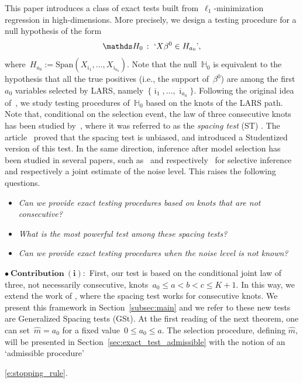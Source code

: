 \documentclass[final,numbib]{imaiai}%
\numberwithin{equation}{section}
\def\eq{\begin{equation}}
\def\qe{\end{equation}}
\renewcommand{\bar}{\overline}
\renewcommand{\hat}{\widehat}
\newcommand{\<}{\langle}
\renewcommand{\>}{\rangle}
\newcommand{\1}{\mathds{1}}
\begin{document}
{This paper introduces a class of exact tests built from~$\ell_1$-minimization regression in high-dimensions. {More precisely, we design a testing procedure for a null hypothesis of the form 
\eq
\notag
\mathds H_0\,:\ \text{`}X\beta^0\in H_{a_0}\text{'},
\qe
where~$H_{a_0}:=\mathrm{Span}(X_{\bar\imath_1},\ldots,X_{ \bar\imath_{a_0}})$.
Note that the null~$\mathds H_0$ is equivalent to the hypothesis that all the true positives (i.e., the support of~$\beta^0$) are among the first~$a_0$ variables selected by LARS, namely~$\{\bar\imath_1,\ldots,\bar\imath_{a_0}\}$.} Following the original idea of~\cite{lockhart2014significance}, we study testing procedures of~$\mathds H_0$ based on the knots of the LARS path.
Note that, conditional on the selection event, the law of three consecutive knots has been studied by~\cite{lockhart2014significance}, where it was referred to as the {\it spacing test} (ST) \citep{hastie2015statistical}.
The article~\cite{azais2018power} proved that the spacing test is unbiased, and introduced a Studentized version of this test.
In the same direction, inference after model selection has been studied in several papers, such as~\cite{fithian2014optimal,taylor2015statistical} and respectively~\cite{tian2018selective} for selective inference and respectively a joint estimate of the noise level.
This raises the following questions.
\begin{itemize}
\item[\bf{[Q2]}]
{\it 
Can we provide exact testing procedures based on knots that are not consecutive?}
\item[\bf{[Q3]}]
{\it 
What is the most powerful test among these spacing tests?}
\item[\bf{[Q4]}]
{\it 
Can we provide exact testing procedures when the noise level is not known?}
\end{itemize}

\noindent $\bullet\ \mathbf{{Contribution\ }(i)}:$ First, our test is based on the conditional joint law of three, not necessarily consecutive, knots~$a_0 \leq a < b < c \leq K + 1$.
In this way, we extend the work of \cite{taylor2014exact}, where the spacing test works for consecutive knots.
We present this framework in Section~\ref{subsec:main} and we refer to these new tests are Generalized Spacing tests (GSt). At the first reading of the next theorem, one can set~$\hat m = a_0$ for a fixed value~$0\leq a_0\leq a$. The selection procedure, defining $\hat m$, will be presented in Section~\ref{sec:exact_test_admissible} with the notion of an `admissible procedure'~{\eqref{e:stopping_rule}.

}}
\end{document}

